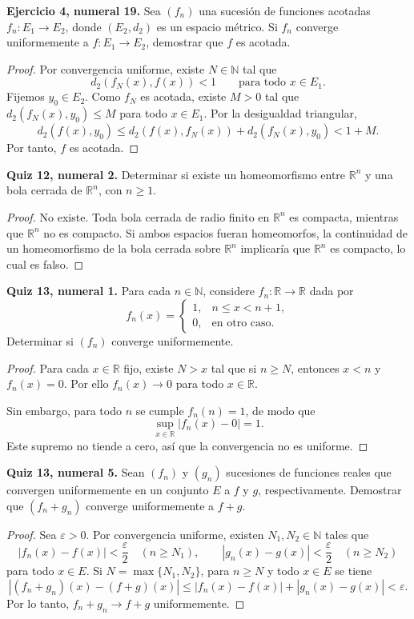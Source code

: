 \documentclass[11pt]{article}
\newcommand{\R}{\mathbb{R}}
\newcommand{\N}{\mathbb{N}}
\begin{document}
\textbf{Ejercicio 4, numeral 19.} Sea $(f_n)$ una sucesión de funciones acotadas $f_n:E_1\to E_2$, donde $(E_2,d_2)$ es un espacio métrico. Si $f_n$ converge uniformemente a $f:E_1\to E_2$, demostrar que $f$ es acotada.

\begin{proof}
Por convergencia uniforme, existe $N\in\N$ tal que
\[
d_2(f_N(x),f(x))<1\qquad\text{para todo }x\in E_1.
\]
Fijemos $y_0\in E_2$. Como $f_N$ es acotada, existe $M>0$ tal que $d_2(f_N(x),y_0)\le M$ para todo $x\in E_1$. Por la desigualdad triangular,
\[
d_2(f(x),y_0)\le d_2(f(x),f_N(x))+d_2(f_N(x),y_0)<1+M.
\]
Por tanto, $f$ es acotada.
\end{proof}

\textbf{Quiz 12, numeral 2.} Determinar si existe un homeomorfismo entre $\R^n$ y una bola cerrada de $\R^n$, con $n\ge1$.

\begin{proof}
No existe. Toda bola cerrada de radio finito en $\R^n$ es compacta, mientras que $\R^n$ no es compacto. Si ambos espacios fueran homeomorfos, la continuidad de un homeomorfismo de la bola cerrada sobre $\R^n$ implicaría que $\R^n$ es compacto, lo cual es falso.
\end{proof}

\textbf{Quiz 13, numeral 1.} Para cada $n\in\N$, considere $f_n:\R\to\R$ dada por
\[
f_n(x)=\begin{cases}1,&n\le x<n+1,\\0,&\text{en otro caso.}\end{cases}
\]
Determinar si $(f_n)$ converge uniformemente.

\begin{proof}
Para cada $x\in\R$ fijo, existe $N>x$ tal que si $n\ge N$, entonces $x<n$ y $f_n(x)=0$. Por ello $f_n(x)\to0$ para todo $x\in\R$.

Sin embargo, para todo $n$ se cumple $f_n(n)=1$, de modo que
\[
\sup_{x\in\R}|f_n(x)-0|=1.
\]
Este supremo no tiende a cero, así que la convergencia no es uniforme.
\end{proof}

\textbf{Quiz 13, numeral 5.} Sean $(f_n)$ y $(g_n)$ sucesiones de funciones reales que convergen uniformemente en un conjunto $E$ a $f$ y $g$, respectivamente. Demostrar que $(f_n+g_n)$ converge uniformemente a $f+g$.

\begin{proof}
Sea $\varepsilon>0$. Por convergencia uniforme, existen $N_1,N_2\in\N$ tales que
\[
|f_n(x)-f(x)|<\frac{\varepsilon}{2}\quad(n\ge N_1),\qquad
|g_n(x)-g(x)|<\frac{\varepsilon}{2}\quad(n\ge N_2)
\]
para todo $x\in E$. Si $N=\max\{N_1,N_2\}$, para $n\ge N$ y todo $x\in E$ se tiene
\[
|(f_n+g_n)(x)-(f+g)(x)|\le |f_n(x)-f(x)|+|g_n(x)-g(x)|<\varepsilon.
\]
Por lo tanto, $f_n+g_n\to f+g$ uniformemente.
\end{proof}
\end{document}
